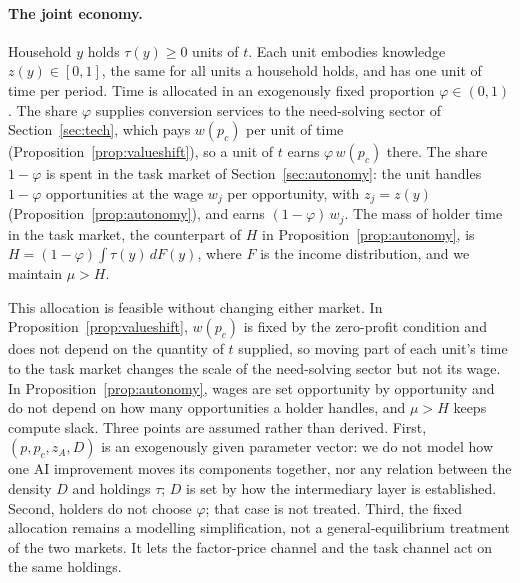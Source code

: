 \documentclass[12pt]{article}
\theoremstyle{remark}
\begin{document}
\paragraph{The joint economy.} Household $y$ holds $\tau(y)\ge0$ units of $t$. Each unit embodies knowledge $z(y)\in[0,1]$, the same for all units a household holds, and has one unit of time per period. Time is allocated in an exogenously fixed proportion $\varphi\in(0,1)$. The share $\varphi$ supplies conversion services to the need-solving sector of Section~\ref{sec:tech}, which pays $w(p_c)$ per unit of time (Proposition~\ref{prop:valueshift}), so a unit of $t$ earns $\varphi\,w(p_c)$ there. The share $1-\varphi$ is spent in the task market of Section~\ref{sec:autonomy}: the unit handles $1-\varphi$ opportunities at the wage $w_j$ per opportunity, with $z_j=z(y)$ (Proposition~\ref{prop:autonomy}), and earns $(1-\varphi)\,w_j$. The mass of holder time in the task market, the counterpart of $H$ in Proposition~\ref{prop:autonomy}, is $H=(1-\varphi)\int\tau(y)\,dF(y)$, where $F$ is the income distribution, and we maintain $\mu>H$.

This allocation is feasible without changing either market. In Proposition~\ref{prop:valueshift}, $w(p_c)$ is fixed by the zero-profit condition and does not depend on the quantity of $t$ supplied, so moving part of each unit's time to the task market changes the scale of the need-solving sector but not its wage. In Proposition~\ref{prop:autonomy}, wages are set opportunity by opportunity and do not depend on how many opportunities a holder handles, and $\mu>H$ keeps compute slack. Three points are assumed rather than derived. First, $(p,p_c,z_A,D)$ is an exogenously given parameter vector: we do not model how one AI improvement moves its components together, nor any relation between the density $D$ and holdings $\tau$; $D$ is set by how the intermediary layer is established. Second, holders do not choose $\varphi$; that case is not treated. Third, the fixed allocation remains a modelling simplification, not a general-equilibrium treatment of the two markets. It lets the factor-price channel and the task channel act on the same holdings.
\end{document}
